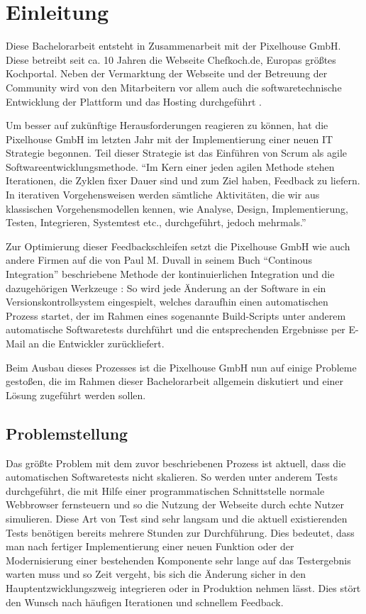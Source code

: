 \section{Einleitung}

Diese Bachelorarbeit entsteht in Zusammenarbeit mit der Pixelhouse GmbH. Diese betreibt seit ca. 10 Jahren die Webseite Chefkoch.de, Europas größtes Kochportal. Neben der Vermarktung der Webseite und der Betreuung der Community wird von den Mitarbeitern vor allem auch die softwaretechnische Entwicklung der Plattform und das Hosting durchgeführt \citep[Vgl.][]{pixelhouse14}.

Um besser auf zukünftige Herausforderungen reagieren zu können, hat die Pixelhouse GmbH im letzten Jahr mit der Implementierung einer neuen IT Strategie begonnen. Teil dieser Strategie ist das Einführen von Scrum als agile Softwareentwicklungsmethode. "`Im Kern einer jeden agilen Methode stehen Iterationen, die Zyklen fixer Dauer sind und zum Ziel haben, Feedback zu liefern. In iterativen Vorgehensweisen werden sämtliche Aktivitäten, die wir aus klassischen Vorgehensmodellen kennen, wie Analyse, Design, Implementierung, Testen, Integrieren, Systemtest etc., durchgeführt, jedoch mehrmals."' \citep[S.][S. 18]{wintersteiger13}

Zur Optimierung dieser Feedbackschleifen setzt die Pixelhouse GmbH wie auch andere Firmen auf die von Paul M. Duvall in seinem Buch "`Continous Integration"' beschriebene Methode der kontinuierlichen Integration und die dazugehörigen Werkzeuge \citep[Vgl.][S. 12]{DuvMatAnd07}: So wird jede Änderung an der Software in ein Versionskontrollsystem eingespielt, welches daraufhin einen automatischen Prozess startet, der im Rahmen eines sogenannte Build-Scripts unter anderem automatische Softwaretests durchführt und die entsprechenden Ergebnisse per E-Mail an die Entwickler zurückliefert.

Beim Ausbau dieses Prozesses ist die Pixelhouse GmbH nun auf einige Probleme gestoßen, die im Rahmen dieser Bachelorarbeit allgemein diskutiert und einer Lösung zugeführt werden sollen.

\subsection{Problemstellung}

Das größte Problem mit dem zuvor beschriebenen Prozess ist aktuell, dass die automatischen Softwaretests nicht skalieren. So werden unter anderem Tests durchgeführt, die mit Hilfe einer programmatischen Schnittstelle normale Webbrowser fernsteuern und so die Nutzung der Webseite durch echte Nutzer simulieren. Diese Art von Test sind sehr langsam und die aktuell existierenden Tests benötigen bereits mehrere Stunden zur Durchführung. Dies bedeutet, dass man nach fertiger Implementierung einer neuen Funktion oder der Modernisierung einer bestehenden Komponente sehr lange auf das Testergebnis warten muss und so Zeit vergeht, bis sich die Änderung sicher in den Hauptentzwicklungszweig integrieren oder in Produktion nehmen lässt. Dies stört den Wunsch nach häufigen Iterationen und schnellem Feedback.

